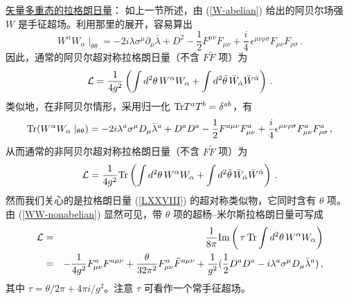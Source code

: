 \noindent\underline{矢量多重态的拉格朗日量}：
\noindent 如上一节所述，由 (\ref{W-abelian}) 给出的阿贝尔场强 $W$ 是手征超场。利用那里的展开，容易算出
$$
W^\alpha W_\alpha\mid_{\theta\theta}=-2i\lambda\sigma^\mu\partial_\mu
\bar{\lambda} + D^2 - \frac{1}{2} F^{\mu\nu} F_{\mu\nu} +\frac{i}{4} \,
\epsilon^{\mu\nu\rho\sigma} F_{\mu\nu}F_{\rho\sigma}\,.
$$
因此，通常的阿贝尔超对称拉格朗日量（不含 $F\widetilde F$ 项）为
$$
{\cal L}=\frac{1}{4g^{2}}\left(\int d^2\theta\, W^\alpha W_\alpha +
\int d^2\bar\theta\, \bar{W}_{\dot\alpha} \bar{W}^{\dot\alpha}\right)\,.
$$
类似地，在非阿贝尔情形，采用归一化
${\rm Tr}T^aT^b=\delta^{ab}$，有
\begin{equation}
{\rm Tr}(W^\alpha W_\alpha \mid_{\theta\theta})=-2i\lambda^a\sigma^\mu 
D_\mu \bar{\lambda}^a +D^a D^a -\frac{1}{2} F^{a\mu\nu}
F^a_{\mu\nu} +\frac{i}{4}\epsilon^{\mu\nu\rho\sigma} F^a_{\mu\nu} 
F^a_{\rho\sigma}\,,
\label{WW-nonabelian}
\end{equation}
从而通常的非阿贝尔超对称拉格朗日量（不含 $F\widetilde F$ 项）为
$$
{\cal L}=\frac{1}{4g^2}{\rm Tr}\left(\int d^2\theta\, W^\alpha W_\alpha 
+\int d^2\bar\theta\, \bar{W}_{\dot\alpha}\bar{W}^{\dot\alpha}\right)\,.
$$
然而我们关心的是拉格朗日量 (\ref{LXXVIII}) 的超对称类似物，它同时含有 $\theta$ 项。由 (\ref{WW-nonabelian}) 显然可见，带 $\theta$ 项的超杨--米尔斯拉格朗日量可写成
\begin{eqnarray}
{\cal L}&=&\frac{1}{8\pi}{\rm Im}\left(\,\tau\,{\rm Tr}\int d^2\theta\,
W^\alpha W_\alpha \right) \nonumber\\
&=&-\frac{1}{4g^2} F^a_{\mu\nu}F^{a\mu\nu}+ \frac{\theta}{32\pi^2}  
F^a_{\mu\nu}\tilde F^{a\mu\nu}+ \frac{1}{g^2}(\frac{1}{2}D^a D^a 
-i\lambda^a\sigma^\mu D_\mu\bar{\lambda}^a) \,,
\label{tauWW}
\end{eqnarray}
其中 $\tau = \theta/2\pi + 4\pi i/g^2$。注意 $\tau$ 可看作一个常手征超场。


